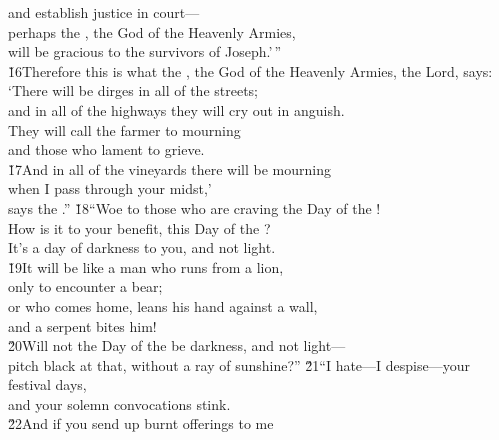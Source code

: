 \begin{poetry}
\poemll    and establish justice in court--- \\
\poeml perhaps the , the God of the Heavenly Armies, \\
\poeml will be gracious to the survivors of Joseph.'\,'' \\
\poeml \v{16}Therefore this is what the , the God of the Heavenly Armies, the Lord, says: \\
\poeml `There will be dirges in all of the streets; \\
\poemlll       and in all of the highways they will cry out in anguish. \\
\poeml They will call the farmer to mourning \\
\poemll    and those who lament to grieve. \\
\poeml \v{17}And in all of the vineyards there will be mourning \\
\poemll    when I pass through your midst,' \\
\poemlll       says the .''
\poeml \v{18}``Woe to those who are craving the Day of the ! \\
\poemll    How is it to your benefit, this Day of the ? \\
\poemlll       It's a day of darkness to you, and not light. \\
\poeml \v{19}It will be like a man who runs from a lion, \\
\poemll    only to encounter a bear; \\
\poeml or who comes home, leans his hand against a wall, \\
\poemll    and a serpent bites him! \\
\poeml \v{20}Will not the Day of the  be darkness, and not light--- \\
\poemll    pitch black at that, without a ray of sunshine?''
\poeml \v{21}``I hate---I despise---your festival days, \\
\poemll    and your solemn convocations stink. \\
\poeml \v{22}And if you send up burnt offerings to me \\

\end{poetry}
